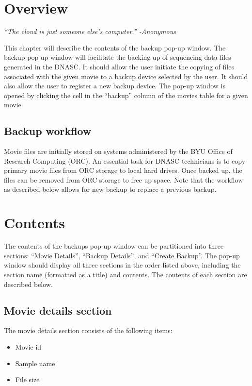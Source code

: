 
\section{Overview}

\vspace{3mm}
\emph{``The cloud is just someone else's computer.'' -Anonymous}
\vspace{3mm}

\noindent This chapter will describe the contents of the backup pop-up window.
The backup pop-up window will facilitate the backing up of sequencing data files 
generated in the DNASC. It should allow the user initiate the copying of
files associated with the given movie to a backup device selected by the user.
It should also allow the user to register a new backup device. The pop-up window 
is opened by clicking the cell in the ``backup'' column of the movies table for a 
given movie.

\subsection{Backup workflow}
Movie files are initially stored on systems administered by the BYU Office of 
Research Computing (ORC). An essential task for DNASC technicians is to copy primary 
movie files from ORC storage to local hard drives. Once backed up, the files can be 
removed from ORC storage to free up space. Note that the workflow as described below
allows for new backup to replace a previous backup.

\section{Contents}

The contents of the backups pop-up window can be partitioned into three sections: 
``Movie Details'', ``Backup Details'', and ``Create Backup''. The pop-up window should 
display all three sections in the order listed above, including the section name 
(formatted as a title) and contents. The contents of each section are described below. 

\subsection{Movie details section}

The movie details section consists of the following items:
\begin{itemize}\itemsep1pt
  \item Movie id
  \item Sample name
  \item File size
\end{itemize}

